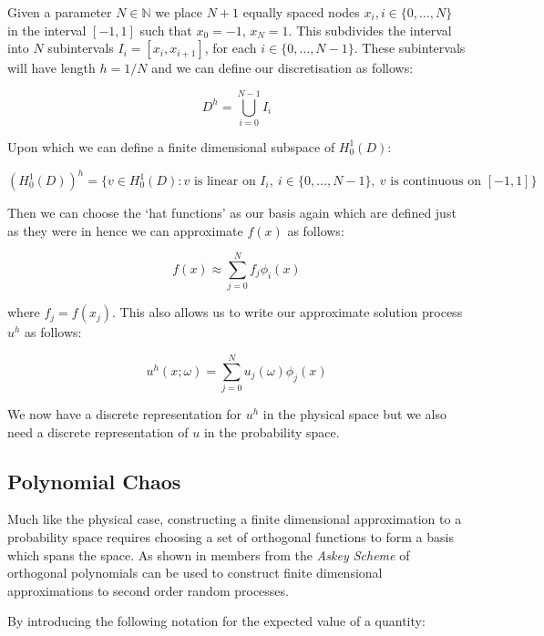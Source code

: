 Given a parameter $N \in \mathbb{N}$ we place $N+1$ equally spaced nodes
$x_i, i \in \{0,\ldots,N\}$ in the interval $[-1,1]$ such that $x_0= -1$,
$x_N = 1$. This subdivides the interval into $N$ subintervals
$I_i = [x_i, x_{i+1}]$, for each $i \in \{0,\ldots,N-1\}$. These subintervals
will have length $h = 1/N$ and we can define our discretisation as follows:

\[
    D^h = \bigcup_{i=0}^{N - 1}I_i
\]

Upon which we can define a finite dimensional subspace of $H^1_0(D)$:

\begin{equation}
    \left(H_0^1(D)\right)^h =
        \{v \in H^1_0(D) : v \text{ is linear on } I_i,\ i \in \{0,\ldots,N-1\},
                        \  v \text{ is continuous on } [-1,1]\}
\end{equation}

Then we can choose the `hat functions' as our basis again which are defined
just as they were in  hence we can approximate $f(x)$
as follows:

\begin{equation}\label{eq:oned-stochastic-f-approx}
    f(x) \approx \sum_{j=0}^Nf_j\phi_i(x)
\end{equation}

where $f_j = f(x_j)$. This also allows us to write our approximate solution
process $u^h$ as follows:

\begin{equation}\label{eq:oned-stochastic-uh}
    u^h(x;\omega) = \sum_{j=0}^Nu_j(\omega)\phi_j(x)
\end{equation}

We now have a discrete representation for $u^h$ in the physical space but we
also need a discrete representation of $u$ in the probability space.

\subsection{Polynomial Chaos}

Much like the physical case, constructing a finite dimensional approximation to
a probability space requires choosing a set of orthogonal functions to form a
basis which spans the space. As shown in \cite{gpc} members from the
\textit{Askey Scheme} of orthogonal polynomials can be used to construct finite
dimensional approximations to second order random processes.

By introducing the following notation for the expected value of a quantity:

